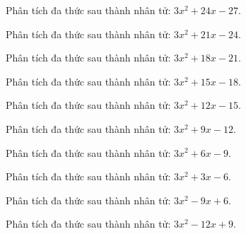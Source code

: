\begin{bt}
	Phân tích đa thức sau thành nhân tử: $3 x^2 + 24 x - 27$.
\end{bt}
\begin{bt}
	Phân tích đa thức sau thành nhân tử: $3 x^2 + 21 x - 24$.
\end{bt}
\begin{bt}
	Phân tích đa thức sau thành nhân tử: $3 x^2 + 18 x - 21$.
\end{bt}
\begin{bt}
	Phân tích đa thức sau thành nhân tử: $3 x^2 + 15 x - 18$.
\end{bt}
\begin{bt}
	Phân tích đa thức sau thành nhân tử: $3 x^2 + 12 x - 15$.
\end{bt}
\begin{bt}
	Phân tích đa thức sau thành nhân tử: $3 x^2 + 9 x - 12$.
\end{bt}
\begin{bt}
	Phân tích đa thức sau thành nhân tử: $3 x^2 + 6 x - 9$.
\end{bt}
\begin{bt}
	Phân tích đa thức sau thành nhân tử: $3 x^2 + 3 x - 6$.
\end{bt}
\begin{bt}
	Phân tích đa thức sau thành nhân tử: $3 x^2 - 9 x + 6$.
\end{bt}
\begin{bt}
	Phân tích đa thức sau thành nhân tử: $3 x^2 - 12 x + 9$.
\end{bt}
